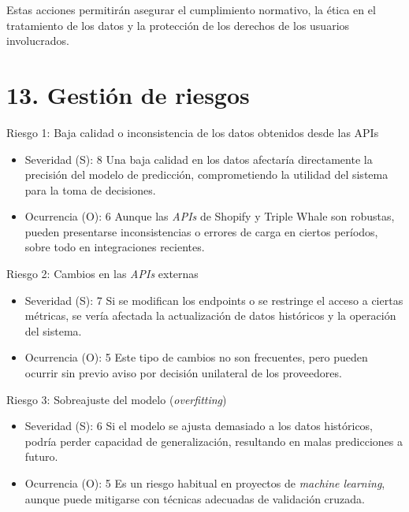 \documentclass[
11pt, %
]{charter}
\begin{document}
Estas acciones permitirán asegurar el cumplimiento normativo, la ética en el tratamiento de los datos y la protección de los derechos de los usuarios involucrados.



\section{13. Gestión de riesgos}
\label{sec:riesgos}


Riesgo 1: Baja calidad o inconsistencia de los datos obtenidos desde las APIs
\begin{itemize}
\item Severidad (S): 8
Una baja calidad en los datos afectaría directamente la precisión del modelo de predicción, comprometiendo la utilidad del sistema para la toma de decisiones.

\item Ocurrencia (O): 6
Aunque las \textit{APIs} de Shopify y Triple Whale son robustas, pueden presentarse inconsistencias o errores de carga en ciertos períodos, sobre todo en integraciones recientes.
\end{itemize}

Riesgo 2: Cambios en las \textit{APIs} externas

\begin{itemize}
\item Severidad (S): 7
Si se modifican los endpoints o se restringe el acceso a ciertas métricas, se vería afectada la actualización de datos históricos y la operación del sistema.

\item Ocurrencia (O): 5
Este tipo de cambios no son frecuentes, pero pueden ocurrir sin previo aviso por decisión unilateral de los proveedores.
\end{itemize}

Riesgo 3: Sobreajuste del modelo (\textit{overfitting})

\begin{itemize}
\item Severidad (S): 6
Si el modelo se ajusta demasiado a los datos históricos, podría perder capacidad de generalización, resultando en malas predicciones a futuro.

\item Ocurrencia (O): 5
Es un riesgo habitual en proyectos de \textit{machine learning}, aunque puede mitigarse con técnicas adecuadas de validación cruzada.
\end{itemize}
\end{document}
